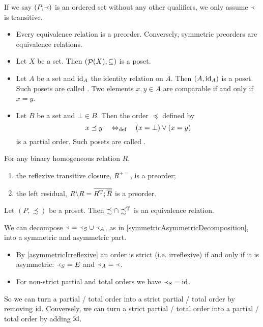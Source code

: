 If we say $\left( P,\Yleft \right)$ is an ordered set without any other qualifiers, we only assume $\Yleft$ is transitive.

\begin{example}
\begin{itemize}
\item Every equivalence relation is a preorder. Conversely, symmetric preorders are equivalence relations.
\item Let $X$ be a set. Then $\left( \mathop{\mathcal{P}}(X), \subseteq \right)$ is a poset.
\item Let $A$ be a set and $\operatorname{id}_A$ the identity relation on $A$. Then $\left( A,\operatorname{id}_A \right)$ is a poset. Such posets are called . Two elements $x,y\in A$ are comparable if and only if $x=y$.
\item Let $B$ be a set and $\bot\in B$. Then the order $\preceq$ defined by
\[ x \preceq y \quad\Leftrightarrow_{\text{def}}\quad (x=\bot) \lor (x = y) \]
is a partial order. Such posets are called .
\end{itemize}
\end{example}

\begin{lemma}
For any binary homogeneous relation $R$,
\begin{enumerate}
\item the reflexive transitive closure, $R^{+=}$, is a preorder;
\item the left residual, $R\backslash R = \overline{R^{\mathrm{T}};\overline{R}}$ is a preorder.
\end{enumerate}
\end{lemma}

\begin{lemma} \label{preorderEquivalence}
Let $(P, \precsim)$ be a proset. Then $\precsim \cap \precsim^{\mathrm{T}}$ is an equivalence relation.
\end{lemma}


We can decompose $\Yleft = \Yleft_S \cup \Yleft_A$, as in \ref{symmetricAsymmetricDecomposition}, into a symmetric and asymmetric part.
\begin{itemize}
\item By \ref{asymmetricIrreflexive} an order is strict (i.e. irreflexive) if and only if it is asymmetric: $\Yleft_S = E$ and $\Yleft_A = \Yleft$.
\item For non-strict partial and total orders we have $\Yleft_S = \operatorname{id}$.
\end{itemize}

So we can turn a partial / total order into a strict partial / total order by removing $\operatorname{id}$. Conversely, we can turn a strict partial / total order into a partial / total order by adding $\operatorname{id}$.

